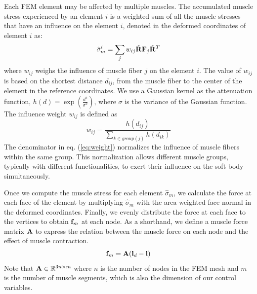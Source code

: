 Each FEM element may be affected by multiple muscles. The
accumulated muscle stress experienced by an element $i$ is a weighted
sum of all the muscle stresses that have an influence on the element
$i$, denoted in the deformed coordinates of element $i$ as:
\begin{equation}
\hat{\sigma}^i_m=\sum_j w_{ij}\hat{\mathbf{R}}\mathbf{F}_j\hat{\mathbf{R}}^T
\end{equation}
where $w_{ij}$ weighs the influence of muscle fiber $j$ on the element
$i$. The value of $w_{ij}$ is based on the shortest distance
$d_{ij}$, from the muscle fiber to the center of the element in the
reference coordinates. We use a Gaussian kernel as the attenuation
function, $h(d) = \exp(\frac{d^2}{\sigma^2})$, where $\sigma$ is the
variance of the Gaussian function. The influence weight $w_{ij}$ is
defined as
\begin{equation}
w_{ij}=\frac{h(d_{ij})}{\sum_{k\in group(j)}h(d_{ik})}
\label{eq:weight}
\end{equation}
The denominator in eq. (\ref{eq:weight}) normalizes the influence of
muscle fibers within the same group. This normalization allows
different muscle groups, typically with different functionalities,
to exert their influence on the soft body simultaneously.


Once we compute the muscle stress for each element $\hat{\sigma}_m$,
we calculate the force at each face of the element by multiplying
$\hat{\sigma}_m$ with the area-weighted face normal in the deformed
coordinates. Finally, we evenly distribute the force at each face to
the vertices to obtain $\mathbf{f}_m$ at each node. As a shorthand, we
define a muscle force matrix $\mathbf{A}$ to express the relation between
the muscle force on each node and the effect of muscle contraction.
\begin{equation}
\mathbf{f}_m = \mathbf{A}(\mathbf{l}_d-\mathbf{l})
\end{equation}
Note that $\mathbf{A}\in \mathbb{R}^{3n\times m}$ where $n$ is the number
of nodes in the FEM mesh and $m$ is the number of muscle segments,
which is also the dimension of our control variables.

